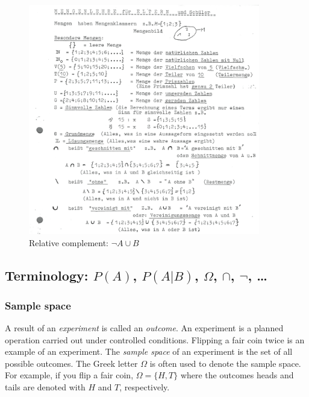\documentclass[
  12pt,
  oneside]{book}
\theoremstyle{definition}
\theoremstyle{definition}
\theoremstyle{definition}
\theoremstyle{definition}
\theoremstyle{remark}
\begin{document}
\begin{figure}
\centering
\includegraphics[width=0.9\textwidth,height=\textheight]{fig/mengenlehre-5.png}
\caption{\label{fig:inschool} Relative complement: \(\neg A \cup B\)}
\end{figure}

\hypertarget{terminology-pa-pab-omega-cap-neg}{%
\subsection{\texorpdfstring{Terminology: \(P(A)\), \(P(A|B)\), \(\Omega\), \(\cap\), \(\neg\), \ldots{}}{Terminology: P(A), P(A\textbar B), \textbackslash Omega, \textbackslash cap, \textbackslash neg, \ldots{}}}\label{terminology-pa-pab-omega-cap-neg}}

\hypertarget{sample-space}{%
\subsubsection{Sample space}\label{sample-space}}

A result of an \emph{experiment} is called an \emph{outcome}. An experiment is a planned operation carried out under controlled conditions. Flipping a fair coin twice is an example of an experiment.
The \emph{sample space} of an experiment is the set of all possible outcomes.
The Greek letter \(\Omega\) is often used to denote the sample space. For example, if you flip a fair coin, \(\Omega = \{H, T\}\) where the outcomes heads and tails are denoted with \(H\) and \(T\), respectively.
\end{document}
